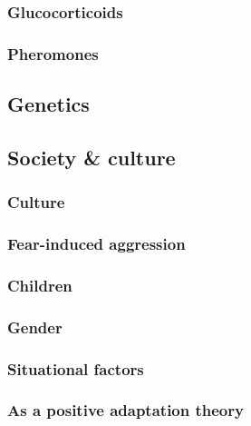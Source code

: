\documentclass[oneside]{book}
\numberwithin{equation}{section}
\begin{document}
\subsubsection{Glucocorticoids}

\subsubsection{Pheromones}

\subsection{Genetics}

\subsection{Society \& culture}

\subsubsection{Culture}

\subsubsection{Fear-induced aggression}

\subsubsection{Children}

\subsubsection{Gender}

\subsubsection{Situational factors}

\subsubsection{As a positive adaptation theory}

\end{document}
